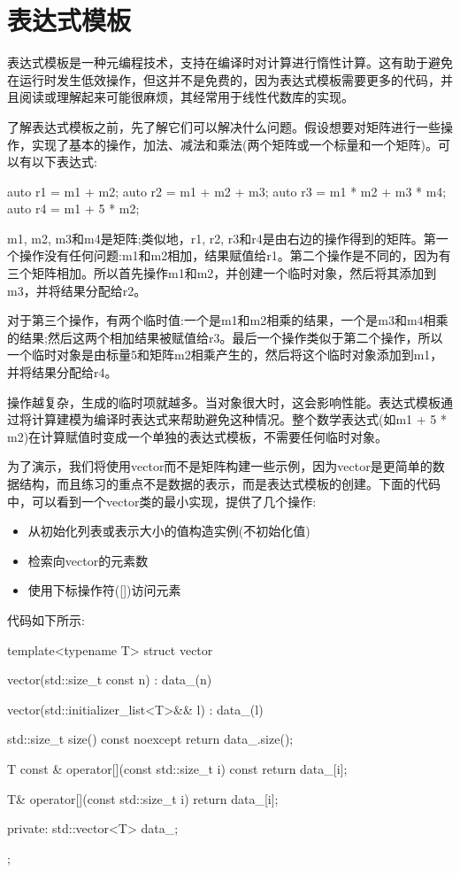 \section{表达式模板}

表达式模板是一种元编程技术，支持在编译时对计算进行惰性计算。这有助于避免在运行时发生低效操作，但这并不是免费的，因为表达式模板需要更多的代码，并且阅读或理解起来可能很麻烦，其经常用于线性代数库的实现。

了解表达式模板之前，先了解它们可以解决什么问题。假设想要对矩阵进行一些操作，实现了基本的操作，加法、减法和乘法(两个矩阵或一个标量和一个矩阵)。可以有以下表达式:

\begin{cpp}
auto r1 = m1 + m2;
auto r2 = m1 + m2 + m3;
auto r3 = m1 * m2 + m3 * m4;
auto r4 = m1 + 5 * m2;
\end{cpp}

m1, m2, m3和m4是矩阵;类似地，r1, r2, r3和r4是由右边的操作得到的矩阵。第一个操作没有任何问题:m1和m2相加，结果赋值给r1。第二个操作是不同的，因为有三个矩阵相加。所以首先操作m1和m2，并创建一个临时对象，然后将其添加到m3，并将结果分配给r2。

对于第三个操作，有两个临时值:一个是m1和m2相乘的结果，一个是m3和m4相乘的结果;然后这两个相加结果被赋值给r3。最后一个操作类似于第二个操作，所以一个临时对象是由标量5和矩阵m2相乘产生的，然后将这个临时对象添加到m1，并将结果分配给r4。

操作越复杂，生成的临时项就越多。当对象很大时，这会影响性能。表达式模板通过将计算建模为编译时表达式来帮助避免这种情况。整个数学表达式(如m1 + 5 * m2)在计算赋值时变成一个单独的表达式模板，不需要任何临时对象。

为了演示，我们将使用vector而不是矩阵构建一些示例，因为vector是更简单的数据结构，而且练习的重点不是数据的表示，而是表达式模板的创建。下面的代码中，可以看到一个vector类的最小实现，提供了几个操作:

\begin{itemize}
\item
从初始化列表或表示大小的值构造实例(不初始化值)

\item
检索向vector的元素数

\item
使用下标操作符([])访问元素
\end{itemize}

代码如下所示:

\begin{cpp}
template<typename T>
struct vector
{
	vector(std::size_t const n) : data_(n) {}
	
	vector(std::initializer_list<T>&& l) : data_(l) {}
	
	std::size_t size() const noexcept
	{
		return data_.size();
	}

	T const & operator[](const std::size_t i) const
	{
		return data_[i];
	}

	T& operator[](const std::size_t i)
	{
		return data_[i];
	}

private:
	std::vector<T> data_;
};
\end{cpp}

